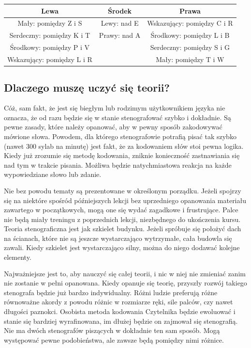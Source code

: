 \documentclass[12p, oneside]{book}
\begin{document}
\begin{tabular}{c c c}
	\hline
	Lewa & Środek & Prawa \\ \hline
	Mały: pomiędzy Z i S & Lewy: nad E & Wskazujący: pomiędzy C i R \\
	Serdeczny: pomiędzy K i T & Prawy: nad A & Środkowy: pomiędzy L i B \\
	Środkowy: pomiędzy P i V & & Serdeczny: pomiędzy S i G \\
	Wskazujący: pomiędzy L i R & & Mały: pomiędzy T i W \\ \hline
\end{tabular}

\subsection{Dlaczego muszę uczyć się teorii?}
Cóż, sam fakt, że jest się biegłym lub rodzimym użytkownikiem języka nie oznacza, że od razu będzie się w stanie stenografować szybko i dokładnie. Są pewne zasady, które należy opanować, aby w pewny sposób zakodowywać mówione słowa. Powodem, dla którego stenografowie potrafią pisać tak szybko (nawet 300 sylab na minutę) jest fakt, że za kodowaniem słów stoi pewna logika. Kiedy już zrozumie się metodę kodowania, zniknie konieczność zastnawiania się nad tym w trakcie pisania. Możliwa będzie natychmiastowa reakcja na każde wypowiedziane słowo lub zdanie.

Nie bez powodu tematy są prezentowane w określonym porządku. Jeżeli spojrzy się na niektóre spośród późniejszych lekcji bez uprzedniego opanowania materiału zawartego w początkowych, mogą one się wydać zagadkowe i frustrujące. Palce nie będą miały treningu z poprzednich lekcji, niezbędnego do ukończenia kursu. Teoria stenograficzna jest jak szkielet budynku. Jeżeli spróbuje się położyć dach na ścianach, które nie są jeszcze wystarczająco wytrzymałe, cała budowla się zawali. Kiedy szkielet jest wystarczająco silny, można do niego dodawać kolejne elementy.

Najważniejsze jest to, aby nauczyć się całej teorii, i nic w niej nie zmieniać zanim nie zostanie w pełni opanowana. Kiedy opanuje się teorię, przyszły rozwój takiego stenografa będzie już bardzo indywidualny. Różni ludzie preferują różne równoważne akordy z powodu różnic w rozmiarze ręki, sile palców, czy nawet długości paznokci. Osobista metoda kodowania Czytelnika będzie ewoluować i stanie się bardziej wyrafinowana, im dłużej będzie on zajmował się stenografią. Nie ma dwóch stenografów piszących w dokładnie ten sam sposób. Mogą występować pewne podobieństwa, ale zawsze będą pomiędzy nimi różnice.
\end{document}
